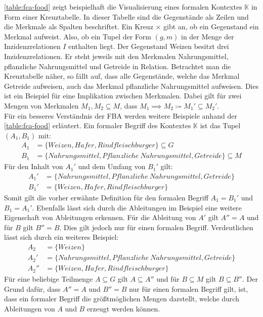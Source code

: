 \autoref{table:fca-food} zeigt beispielhaft die Visualisierung eines formalen Kontextes $\mathbb{K}$ in Form einer Kreuztabelle.
In dieser Tabelle sind die Gegenstände als Zeilen und die Merkmale als Spalten beschriftet.
Ein Kreuz $\times$ gibt an, ob ein Gegenstand ein Merkmal aufweist.
Also, ob ein Tupel der Form $(g,m)$ in der Menge der Inzidenzrelationen $I$ enthalten liegt.
Der Gegenstand Weizen besitzt drei Inzidenzrelationen.
Er steht jeweils mit den Merkmalen Nahrungsmittel, pflanzliche Nahrungsmittel und Getreide in Relation.
Betrachtet man die Kreuztabelle näher, so fällt auf, dass alle Gegenstände, welche das Merkmal Getreide aufweisen, auch das Merkmal pflanzliche Nahrungsmittel aufweisen.
Dies ist ein Beispiel für eine Implikation zwischen Merkmalen.
Dabei gilt für zwei Mengen von Merkmalen $M_1, M_2 \subseteq M$, dass $M_1\implies M_2 \coloneqq M_1' \subseteq M_2'$.\\

Für ein besseres Verständnis der \ac{FBA} werden weitere Beispiele anhand der \autoref{table:fca-food} erläutert.
Ein formaler Begriff des Kontextes $\mathbb{K}$ ist das Tupel $(A_1, B_1)$ mit:
\begin{align}
    A_1 & = \{Weizen, Hafer, Rindfleischburger\} \subseteq G                     \\
    B_1 & = \{Nahrungsmittel, Pflanzliche\ Nahrungsmittel,Getreide\} \subseteq M
\end{align}
Für den Inhalt von $A_1'$ und dem Umfang von $B_1'$ gilt:
\begin{align}
    A_1' & = \{Nahrungsmittel, Pflanzliche\ Nahrungsmittel, Getreide\} \\
    B_1' & = \{Weizen, Hafer, Rindfleischburger\}
\end{align}
Somit gilt die vorher erwähnte Definition für den formalen Begriff $A_1 = B_1'$ und $B_1 = A_1'$.
Ebenfalls lässt sich durch die Ableitungen im Beispiel eine weitere Eigenschaft von Ableitungen erkennen.
Für die Ableitung von $A'$ gilt $A'' = A$ und für $B$ gilt $B'' = B$.
Dies gilt jedoch nur für einen formalen Begriff.
Verdeutlichen lässt sich durch ein weiteres Beispiel:
\setcounter{equation}{0}
\begin{align}
    A_2   & = \{Weizen\}                                                \\
    A_2'  & = \{Nahrungsmittel, Pflanzliche\ Nahrungsmittel, Getreide\} \\
    A_2'' & = \{Weizen, Hafer, Rindfleischburger\}
\end{align}
Für eine beliebige Teilmenge $A \subseteq G$ gilt $A \subseteq A''$ und für $B \subseteq M$ gilt $B \subseteq B''$.
Der Grund dafür, dass $A'' = A$ und $B'' = B$ nur für einen formalen Begriff gilt, ist, dass ein formaler Begriff die größtmöglichen Mengen darstellt, welche durch Ableitungen von $A$ und $B$ erzeugt werden können.

